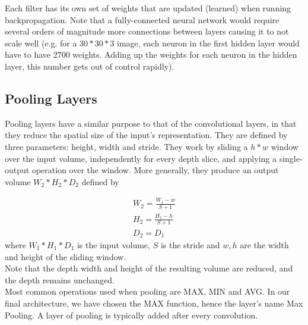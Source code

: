 Each filter has its own set of weights that are updated (learned) when running backpropagation.
Note that a fully-connected neural network would require several orders of magnitude more connections between layers causing it to not scale well (e.g. for a $30*30*3$ image, each neuron in the first hidden layer would have to have 2700 weights. Adding up the weights for each neuron in the hidden layer, this number gets out of control rapidly).
\subsection{Pooling Layers}
Pooling layers have a similar purpose to that of the convolutional layers, in that they reduce the spatial size of the input's representation. They are defined by three parameters: height, width and stride. They work by sliding a $h*w$ window over the input volume, independently for every depth slice, and applying a single-output operation over the window. More generally, they produce an output volume $W_2*H_2*D_2$ defined by

\begin{gather*}
W_2=\frac{W_1-w}{S+1}\\
H_2=\frac{H_1-h}{S+1}\\
D_2=D_1
\end{gather*}
where $W_1*H_1*D_1$ is the input volume, $S$ is the stride and $w,h$ are the width and height of the sliding window.\\
Note that the depth width and height of the resulting volume are reduced, and the depth remains unchanged.\\
Most common operations used when pooling are MAX, MIN and AVG. In our final architecture, we have chosen the MAX function, hence the layer's name Max Pooling. A layer of pooling is typically added after every convolution.

